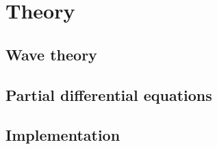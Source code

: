 \section{Theory}
\label{sec:theory}

\subsection{Wave theory}
\label{sec:wave}

\subsection{Partial differential equations}
\label{sec:pde}

\subsection{Implementation}
\label{sec:implement}